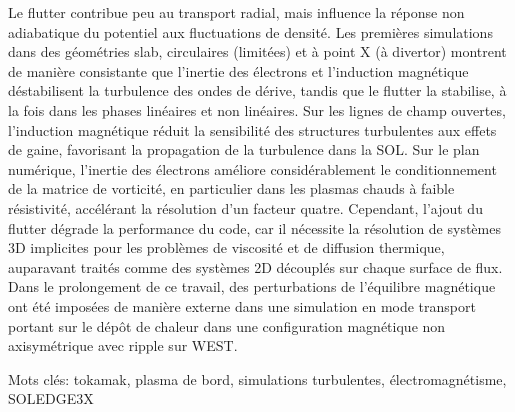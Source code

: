 Le flutter contribue peu au transport radial, mais influence la réponse non adiabatique du potentiel aux fluctuations de densité. Les premières simulations dans des géométries slab, circulaires (limitées) et à point X (à divertor) montrent de manière consistante que l'inertie des électrons et l'induction magnétique déstabilisent la turbulence des ondes de dérive, tandis que le flutter la stabilise, à la fois dans les phases linéaires et non linéaires. Sur les lignes de champ ouvertes, l'induction magnétique réduit la sensibilité des structures turbulentes aux effets de gaine, favorisant la propagation de la turbulence dans la SOL. Sur le plan numérique, l'inertie des électrons améliore considérablement le conditionnement de la matrice de vorticité, en particulier dans les plasmas chauds à faible résistivité, accélérant la résolution d'un facteur quatre. Cependant, l'ajout du flutter dégrade la performance du code, car il nécessite la résolution de systèmes 3D implicites pour les problèmes de viscosité et de diffusion thermique, auparavant traités comme des systèmes 2D découplés sur chaque surface de flux. Dans le prolongement de ce travail, des perturbations de l'équilibre magnétique ont été imposées de manière externe dans une simulation en mode transport portant sur le dépôt de chaleur dans une configuration magnétique non axisymétrique avec ripple sur WEST.




\vspace{0.5cm}
Mots clés: tokamak, plasma de bord, simulations turbulentes, électromagnétisme, SOLEDGE3X



